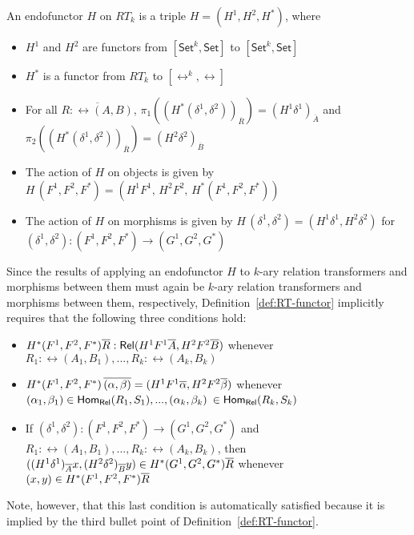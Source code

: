 \documentclass{lmcs}
\theoremstyle{plain}\newtheorem{satz}[thm]{Satz}
\newcommand{\set}{\mathsf{Set}}
\begin{document}
\begin{defi}\label{def:RT-functor}
An endofunctor $H$ on $RT_k$ is a triple $H = (H^1,H^2,H^*)$, where
\begin{itemize}
\item $H^1$ and $H^2$ are functors from $[\set^k,\set]$ to $[\set^k,\set]$
\item $H^*$ is a functor from $RT_k$ to $[\rel^k,\rel]$
\item For all $\overline{R : \rel(A,B)}$,
  $\pi_1((H^*(\delta^1,\delta^2))_{\overline{R}}) = (H^1
  \delta^1)_{\overline{A}}$ and
  $\pi_2((H^*(\delta^1,\delta^2))_{\overline{R}}) = (H^2
  \delta^2)_{\overline{B}}$
\item The action of $H$ on objects is given by $H\,(F^1,F^2,F^*) =
  (H^1F^1,\,H^2F^2,\,H^*(F^1,F^2,F^*))$
\item The action of $H$ on morphisms is given by
  $H\,(\delta^1,\delta^2) = (H^1\delta^1,H^2\delta^2)$ for
  $(\delta^1,\delta^2) : (F^1,F^2,F^*)\to (G^1,G^2,G^*)$
\end{itemize}
\end{defi}
Since the results of applying an endofunctor $H$ to $k$-ary relation
transformers and morphisms between them must again be $k$-ary relation
transformers and morphisms between them, respectively,
Definition~\ref{def:RT-functor} implicitly requires that the following
three conditions hold:
\begin{itemize}
\item $H^*(F^1,F^2,F^*) \overline{R} : \mathsf{Rel}(H^1F^1 \overline{A}, H^2F^2 \overline{B})$
  whenever $R_1:\rel(A_1,B_1),...,R_k:\rel(A_k,B_k)$
\item $H^*(F^1,F^2,F^*)\, \overline{(\alpha, \beta)} = (H^1F^1\overline{\alpha},
  H^2F^2 \overline{\beta})$ whenever $(\alpha_1, \beta_1) \in
  \mathsf{Hom_{Rel}}(R_1,S_1),..., (\alpha_k, \beta_k)$ $\in \mathsf{Hom_{Rel}}(R_k,S_k)$
\item If $(\delta^1,\delta^2) : (F^1,F^2,F^*)\to (G^1,G^2,G^*)$ and
  $R_1:\rel(A_1,B_1),...,R_k:\rel(A_k,B_k)$, then
  $((H^1\delta^1)_{\overline{A}}x, (H^2\delta^2)_{\overline{B}}y) \in
  H^*(G^1,G^2,G^*)\overline{R}$ whenever $(x, y) \in H^*(F^1,F^2,F^*)\overline{R}$
\end{itemize}
  Note, however, that this last condition is
  automatically satisfied because it is implied by the third bullet
  point of Definition~\ref{def:RT-functor}.
\end{document}
